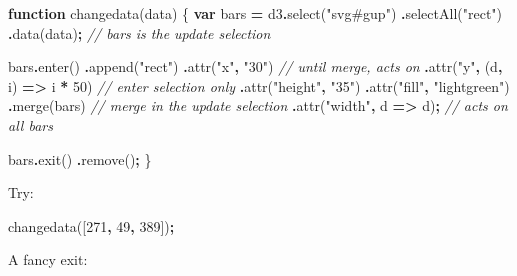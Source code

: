 \documentclass[
  openany]{book}
\newenvironment{Shaded}{\begin{snugshade}}{\end{snugshade}}
\newcommand{\CommentTok}[1]{\textcolor[rgb]{0.56,0.35,0.01}{\textit{#1}}}
\newcommand{\DecValTok}[1]{\textcolor[rgb]{0.00,0.00,0.81}{#1}}
\newcommand{\FunctionTok}[1]{\textcolor[rgb]{0.00,0.00,0.00}{#1}}
\newcommand{\KeywordTok}[1]{\textcolor[rgb]{0.13,0.29,0.53}{\textbf{#1}}}
\newcommand{\NormalTok}[1]{#1}
\newcommand{\OperatorTok}[1]{\textcolor[rgb]{0.81,0.36,0.00}{\textbf{#1}}}
\newcommand{\StringTok}[1]{\textcolor[rgb]{0.31,0.60,0.02}{#1}}
\begin{document}
\begin{Shaded}
\begin{Highlighting}[]
\KeywordTok{function} \FunctionTok{changedata}\NormalTok{(data) \{}
  \KeywordTok{var}\NormalTok{ bars }\OperatorTok{=}\NormalTok{ d3}\OperatorTok{.}\FunctionTok{select}\NormalTok{(}\StringTok{"svg\#gup"}\NormalTok{) }
    \OperatorTok{.}\FunctionTok{selectAll}\NormalTok{(}\StringTok{"rect"}\NormalTok{)}
    \OperatorTok{.}\FunctionTok{data}\NormalTok{(data)}\OperatorTok{;}    \CommentTok{// bars is the update selection}
    
\NormalTok{  bars}\OperatorTok{.}\FunctionTok{enter}\NormalTok{()}
    \OperatorTok{.}\FunctionTok{append}\NormalTok{(}\StringTok{"rect"}\NormalTok{)}
      \OperatorTok{.}\FunctionTok{attr}\NormalTok{(}\StringTok{"x"}\OperatorTok{,} \StringTok{"30"}\NormalTok{)  }\CommentTok{// until merge, acts on}
      \OperatorTok{.}\FunctionTok{attr}\NormalTok{(}\StringTok{"y"}\OperatorTok{,}\NormalTok{ (d}\OperatorTok{,}\NormalTok{ i) }\KeywordTok{=\textgreater{}}\NormalTok{ i }\OperatorTok{*} \DecValTok{50}\NormalTok{) }\CommentTok{// enter selection only}
      \OperatorTok{.}\FunctionTok{attr}\NormalTok{(}\StringTok{"height"}\OperatorTok{,} \StringTok{"35"}\NormalTok{)  }
      \OperatorTok{.}\FunctionTok{attr}\NormalTok{(}\StringTok{"fill"}\OperatorTok{,} \StringTok{"lightgreen"}\NormalTok{)}
    \OperatorTok{.}\FunctionTok{merge}\NormalTok{(bars) }\CommentTok{// merge in the update selection}
      \OperatorTok{.}\FunctionTok{attr}\NormalTok{(}\StringTok{"width"}\OperatorTok{,}\NormalTok{ d }\KeywordTok{=\textgreater{}}\NormalTok{ d)}\OperatorTok{;} \CommentTok{// acts on all bars}
      
\NormalTok{  bars}\OperatorTok{.}\FunctionTok{exit}\NormalTok{()}
    \OperatorTok{.}\FunctionTok{remove}\NormalTok{()}\OperatorTok{;}
\NormalTok{  \}}
\end{Highlighting}
\end{Shaded}

Try:

\begin{Shaded}
\begin{Highlighting}[]
\NormalTok{changedata([}\DecValTok{271}\OperatorTok{,} \DecValTok{49}\OperatorTok{,} \DecValTok{389}\NormalTok{])}\OperatorTok{;}
\end{Highlighting}
\end{Shaded}

A fancy exit:
\end{document}
